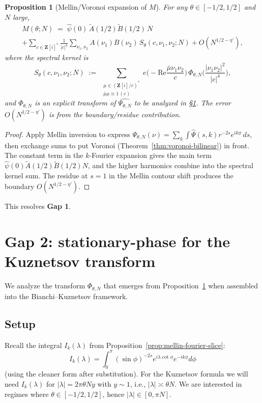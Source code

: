 \documentclass[11pt]{article}
\newtheorem{proposition}[theorem]{Proposition}
\theoremstyle{definition}
\newcommand{\Z}{\mathbf{Z}}
\newcommand{\Zi}{\Z[i]}
\renewcommand{\Re}{\mathrm{Re}}
\begin{document}
\begin{proposition}[Mellin/Voronoi expansion of $M$]\label{prop:M-mellin-voronoi}
For any $\theta\in[-1/2,1/2]$ and $N$ large,
\begin{multline}\label{eq:M-expansion}
M(\theta;N)\;=\;\widehat\psi(0)\,\widetilde A(1/2)\widetilde B(1/2)\,N\\
+\sum_{c\in\Zi^*}\frac{1}{|c|^4}\sum_{\nu_1,\nu_2}A(\nu_1)B(\nu_2)\,S_\theta(c,\nu_1,\nu_2;N)+O(N^{1/2-\eta'}),
\end{multline}
where the spectral kernel is
\[
S_\theta(c,\nu_1,\nu_2;N)\;:=\;\sum_{\substack{\mu\in(\Zi/c)^*\\\bar\mu\mu\equiv 1\,(c)}}e\Big(-\Re\frac{\bar\mu\nu_1\nu_2}{c}\Big)\,\Phi_{\theta,N}\!\Big(\frac{|\nu_1\nu_2|^2}{|c|^4}\Big),
\]
and $\Phi_{\theta,N}$ is an explicit transform of $\widehat{\Psi_{\theta,N}}$ to be analyzed in §\ref{sec:gap2}. The error $O(N^{1/2-\eta'})$ is from the boundary/residue contribution.
\end{proposition}

\begin{proof}
Apply Mellin inversion to express $\Psi_{\theta,N}(\nu)=\sum_k\int\widehat\Psi(s,k)r^{-2s}e^{ik\phi}\,ds$, then exchange sums to put Voronoi (Theorem~\ref{thm:voronoi-bilinear}) in front. The constant term in the $k$-Fourier expansion gives the main term $\widehat\psi(0)\widetilde A(1/2)\widetilde B(1/2)N$, and the higher harmonics combine into the spectral kernel sum. The residue at $s=1$ in the Mellin contour shift produces the boundary $O(N^{1/2-\eta'})$.
\end{proof}

This resolves \textbf{Gap 1}.

\section{Gap 2: stationary-phase for the Kuznetsov transform}\label{sec:gap2}

We analyze the transform $\Phi_{\theta,N}$ that emerges from Proposition~\ref{prop:M-mellin-voronoi} when assembled into the Bianchi--Kuznetsov framework.

\subsection{Setup}

Recall the integral $I_k(\lambda)$ from Proposition~\ref{prop:mellin-fourier-slice}:
\[
I_k(\lambda)=\int_0^\pi(\sin\phi)^{-2s}e^{i\lambda\cot\phi}e^{-ik\phi}d\phi
\]
(using the cleaner form after substitution). For the Kuznetsov formula we will need $I_k(\lambda)$ for $|\lambda|=2\pi\theta Ny$ with $y\sim 1$, i.e., $|\lambda|\asymp\theta N$. We are interested in regimes where $\theta\in[-1/2,1/2]$, hence $|\lambda|\in[0,\pi N]$.
\end{document}
